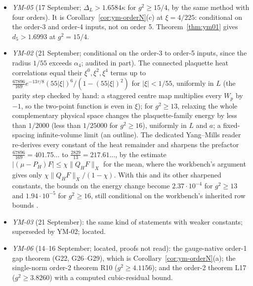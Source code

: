 \begin{itemize}
\item \emph{YM-05} (17 September; $\Delta_L>1.6584\kappa$ for $g^2\ge15/4$, by the same method with four orders). It is Corollary~\ref{cor:ym-orderN}(c) at $\xi=4/225$: conditional on the order-3 and order-4 inputs, not on order 5. Theorem~\ref{thm:ym01} gives $d_5>1.6993$ at $g^2=15/4$.
\item \emph{YM-02} (21 September; conditional on the order-3 to order-5 inputs, since the radius $1/55$ exceeds $\alpha_4$; audited in part). The connected plaquette heat correlations equal their $\xi^0,\xi^2,\xi^4$ terms up to $\frac{67896}{169}e^{-13\tau/8}(55|\xi|)^6/(1-(55|\xi|)^2)$ for $|\xi|<1/55$, uniformly in $L$ (the parity step checked by hand: a staggered centre map multiplies every $W_p$ by $-1$, so the two-point function is even in $\xi$); for $g^2\ge13$, relaxing the whole complementary physical space changes the plaquette-family energy by less than $1/2000$ (less than $1/25000$ for $g^2\ge16$), uniformly in $L$ and $a$; a fixed-spacing infinite-volume limit (an outline). The dedicated Yang--Mills reader re-derives every constant of the heat remainder and sharpens the prefactor $\frac{67896}{169}=401.75\ldots$ to $\frac{2829}{13}=217.61\ldots$, by the estimate $|(\mu-P_H)F|\le\chi\|Q_HF\|_X$ for the mean, where the workbench's argument gives only $\chi\|Q_HF\|_X/(1-\chi)$. With this and its other sharpened constants, the bounds on the energy change become $2.37\cdot10^{-4}$ for $g^2\ge13$ and $1.94\cdot10^{-5}$ for $g^2\ge16$, still conditional on the workbench's inherited row bounds \cite[Theorem~4.1 and §4.3]{YMReader}.
\item \emph{YM-03} (21 September): the same kind of statements with weaker constants; superseded by YM-02; located.
\item \emph{YM-06} (14--16 September; located, proofs not read): the gauge-native order-1 gap theorem (G22, G26--G29), which is Corollary~\ref{cor:ym-orderN}(a); the single-norm order-2 theorem R10 ($g^2\ge4.1156$); and the order-2 theorem L17 ($g^2\ge3.8260$) with a computed cubic-residual bound.
\end{itemize}

